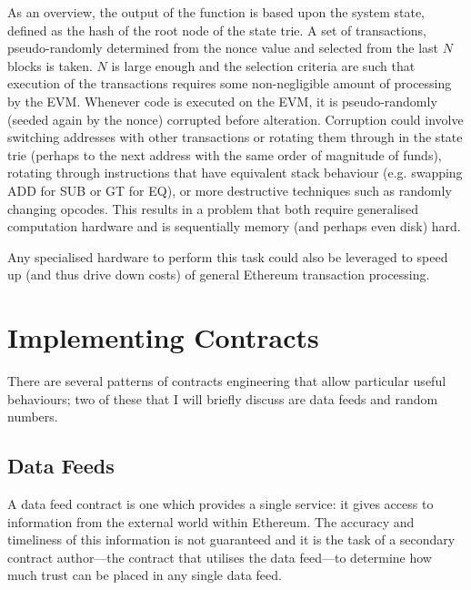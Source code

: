 \documentclass[9pt,oneside]{amsart}
\makeatletter
\newcommand*\eg{e.g.\@\xspace}
\makeatother
\begin{document}
\begin{multicols}{2}
As an overview, the output of the function is based upon the system state, defined as the hash of the root node of the state trie. A set of transactions, pseudo-randomly determined from the nonce value and selected from the last $N$ blocks is taken. $N$ is large enough and the selection criteria are such that execution of the transactions requires some non-negligible amount of processing by the EVM. Whenever code is executed on the EVM, it is pseudo-randomly (seeded again by the nonce) corrupted before alteration. Corruption could involve switching addresses with other transactions or rotating them through in the state trie (perhaps to the next address with the same order of magnitude of funds), rotating through instructions that have equivalent stack behaviour (e.g. swapping {\small ADD} for {\small SUB} or {\small GT} for {\small EQ}), or more destructive techniques such as randomly changing opcodes. This results in a problem that both require generalised computation hardware and is sequentially memory (and perhaps even disk) hard.

Any specialised hardware to perform this task could also be leveraged to speed up (and thus drive down costs) of general Ethereum transaction processing.

%

\section{Implementing Contracts}

There are several patterns of contracts engineering that allow particular useful behaviours; two of these that I will briefly discuss are data feeds and random numbers. 

\subsection{Data Feeds}
A data feed contract is one which provides a single service: it gives access to information from the external world within Ethereum. The accuracy and timeliness of this information is not guaranteed and it is the task of a secondary contract author---the contract that utilises the data feed---to determine how much trust can be placed in any single data feed.


\end{multicols}
\end{document}
